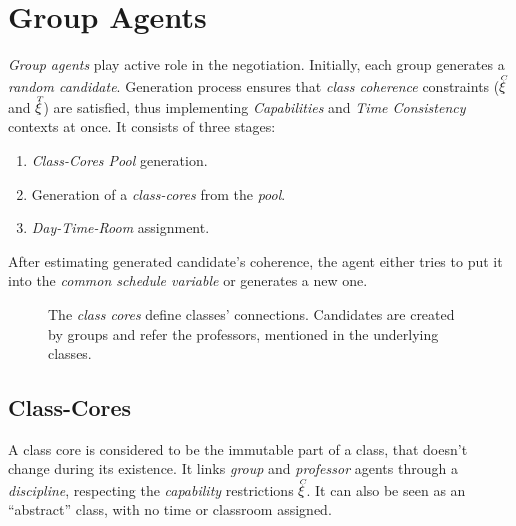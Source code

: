 \documentclass[../../header]{subfiles}
\begin{document}
\providecommand{\rootdir}{../..}


\section{Group Agents}

\emph{Group agents} play active role in the negotiation.
Initially, each group generates a \emph{random candidate}.
Generation process ensures that \emph{class coherence} constraints
($\accentset{C}{\xi}$ and $\accentset{T}{\xi}$) are satisfied, thus implementing \textit{Capabilities}
and \textit{Time Consistency} contexts at once. It consists of three stages:
\begin{enumerate}
  \item \emph{Class-Cores Pool} generation.
  \item Generation of a \emph{class-cores} from the \emph{pool}.
  \item \emph{Day-Time-Room} assignment.
\end{enumerate}


\noindent
After estimating generated candidate's coherence, the agent either tries to put
it into the \emph{common schedule variable} or generates a new one.



\begin{figure}[H]
  \centering
  
  \caption[Class cores and candidates]
          {The \emph{class cores} define classes' connections. Candidates are
           created by groups and refer the professors, mentioned in the
           underlying classes. }
  \label{fig:class-cores}
\end{figure}

\subsection{Class-Cores}
\label{sec:solution-CC}

A class core is considered to be the immutable part of a class, that doesn't
change during its existence. It links \emph{group} and \emph{professor} agents
through a \emph{discipline}, respecting the \emph{capability} restrictions $\accentset{C}{\xi}$.
It can also be seen as an ``abstract'' class, with no time or classroom assigned.
\end{document}
